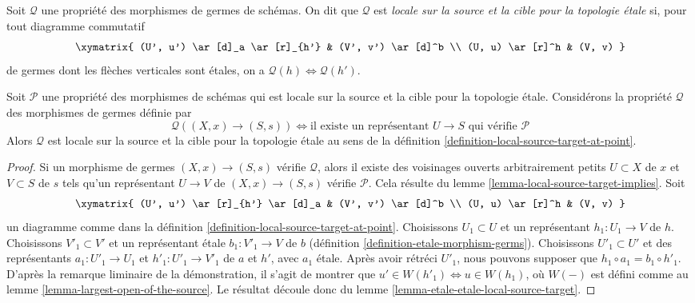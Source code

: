 \begin{definition}
\label{definition-local-source-target-at-point}
Soit $\mathcal{Q}$ une propriété des morphismes de germes de schémas.
On dit que $\mathcal{Q}$ est {\it locale sur la source et la cible pour la
topologie \'etale} si, pour tout diagramme commutatif
$$
\xymatrix{
(U', u') \ar[d]_a \ar[r]_{h'} & (V', v') \ar[d]^b \\
(U, u) \ar[r]^h & (V, v)
}
$$
de germes dont les flèches verticales sont étales, on a
$\mathcal{Q}(h) \Leftrightarrow \mathcal{Q}(h')$.
\end{definition}

\begin{lemma}
\label{lemma-local-source-target-global-implies-local}
Soit $\mathcal{P}$ une propriété des morphismes de schémas
qui est locale sur la source et la cible pour la topologie \'etale.
Considérons la propriété $\mathcal{Q}$ des morphismes de germes définie par
$$
\mathcal{Q}((X, x) \to (S, s))
\Leftrightarrow
\text{il existe un représentant }U \to S
\text{ qui vérifie }\mathcal{P}
$$
Alors $\mathcal{Q}$ est locale sur la source et la cible pour la topologie
\'etale au sens de la
définition \ref{definition-local-source-target-at-point}.
\end{lemma}

\begin{proof}
Si un morphisme de germes $(X, x) \to (S, s)$ vérifie $\mathcal{Q}$,
alors il existe des voisinages ouverts arbitrairement petits
$U \subset X$ de $x$ et $V \subset S$ de $s$ tels qu'un représentant
$U \to V$ de $(X, x) \to (S, s)$ vérifie $\mathcal{P}$.
Cela résulte du lemme \ref{lemma-local-source-target-implies}. Soit
$$
\xymatrix{
(U', u') \ar[r]_{h'} \ar[d]_a & (V', v') \ar[d]^b \\
(U, u) \ar[r]^h & (V, v)
}
$$
un diagramme comme dans la
définition \ref{definition-local-source-target-at-point}.
Choisissons $U_1 \subset U$ et un représentant $h_1 : U_1 \to V$ de $h$.
Choisissons $V'_1 \subset V'$ et un représentant \'etale
$b_1 : V'_1 \to V$ de $b$
(définition \ref{definition-etale-morphism-germs}).
Choisissons $U'_1 \subset U'$ et des représentants
$a_1 : U'_1 \to U_1$ et $h'_1 : U'_1 \to V'_1$ de $a$ et $h'$,
avec $a_1$ \'etale. Après avoir rétréci $U'_1$, nous pouvons supposer que
$h_1 \circ a_1 = b_1 \circ h'_1$. D'après la remarque liminaire de la
démonstration, il s'agit de montrer que
$u' \in W(h'_1) \Leftrightarrow u \in W(h_1)$, où $W(-)$ est défini comme
au lemme \ref{lemma-largest-open-of-the-source}.
Le résultat découle donc du
lemme \ref{lemma-etale-etale-local-source-target}.
\end{proof}

